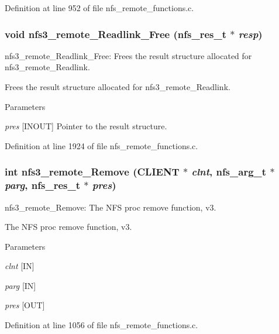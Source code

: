 Definition at line 952 of file nfs\_\-remote\_\-functions.c.
\subsubsection[{nfs3\_\-remote\_\-Readlink\_\-Free}]{\setlength{\rightskip}{0pt plus 5cm}void nfs3\_\-remote\_\-Readlink\_\-Free (nfs\_\-res\_\-t $\ast$ {\em resp})}\label{group__NFSprocs_ga5d7d2dd373ccace7e64731e90aa6104e}
nfs3\_\-remote\_\-Readlink\_\-Free: Frees the result structure allocated for nfs3\_\-remote\_\-Readlink.

Frees the result structure allocated for nfs3\_\-remote\_\-Readlink.


\begin{DoxyParams}{Parameters}
\item[{\em pres}][INOUT] Pointer to the result structure. \end{DoxyParams}


Definition at line 1924 of file nfs\_\-remote\_\-functions.c.
\subsubsection[{nfs3\_\-remote\_\-Remove}]{\setlength{\rightskip}{0pt plus 5cm}int nfs3\_\-remote\_\-Remove (CLIENT $\ast$ {\em clnt}, \/  nfs\_\-arg\_\-t $\ast$ {\em parg}, \/  nfs\_\-res\_\-t $\ast$ {\em pres})}\label{group__NFSprocs_ga2b803ebb027674245c6f5a78f28df61c}
nfs3\_\-remote\_\-Remove: The NFS proc remove function, v3.

The NFS proc remove function, v3.


\begin{DoxyParams}{Parameters}
\item[{\em clnt}][IN] \item[{\em parg}][IN] \item[{\em pres}][OUT] \end{DoxyParams}


Definition at line 1056 of file nfs\_\-remote\_\-functions.c.

